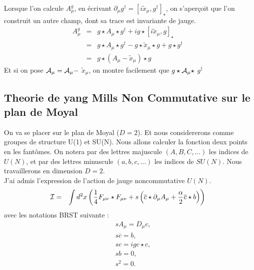 \documentclass[a4paper,11pt]{article}
\theoremstyle{plain}
\theoremstyle{definition}
\theoremstyle{remark}
\numberwithin{equation}{section}
\numberwithin{equation}{subsection}
\numberwithin{figure}{section}
\begin{document}
\noindent
Lorsque l'on calcule $A_{\mu}^{g}$, en écrivant $ \partial_{\mu} g^{\dagger}  =  [ i \tilde{x}_{\mu} , g^{\dagger}   ]_{\star}$, on s'aperçoit 
que l'on construit un autre champ, dont sa trace est invariante de jauge.
\begin{eqnarray}
  A_{\mu}^{g}  &=&  g \star A_{\mu} \star g^{\dagger} + i g \star  [ i \tilde{x}_{\mu} , g ]_{\star}   \\
                         &=&  g \star A_{\mu} \star g^{\dagger} - g \star  \tilde{x}_{\mu} \star  g  + g \star  g^{\dagger}     \\
                         &=&  g \star \left(  A_{\mu} -  \tilde{x}_{\mu} \right) \star  g
\end{eqnarray}
Et si on pose $\cal{A}_{\mu}  =  A_{\mu} - $ $ \tilde{x}_{\mu}  $, on montre facilement que $g \star \cal{A}_{\mu}  \star$  $g^{\dagger}$

\subsection{Theorie de yang Mills Non Commutative sur le plan de Moyal}

\noindent
On va se placer sur le plan de Moyal ($D=2$). Et nous considererons comme groupes de structure U(1) et SU(N).
\noindent
Nous allons calculer la fonction deux points en les fantômes. On notera par des lettres majuscule $(A,B,C,...)$ les indices de $U(N)$, 
et par des lettres minuscule $(a,b,c,...)$ les indices de $SU(N)$. Nous travaillerons en dimension $D=2$.\\

\noindent
J'ai admis l'expression de l'action de jauge noncommutative $U(N)$.
\begin{eqnarray}
 \cal{I}  &=&  \int d^{2 } x  \left(  \frac{1}{4}  F_{\mu  \nu}  \star  F_{\mu  \nu}  + s \left( \overline{c} \star \partial_{\mu} A_{\mu}   
+  \frac{\alpha}{2} \overline{c} \star b \right)  \right)
\end{eqnarray}
avec les notations BRST suivante :
\begin{eqnarray}
 &&s A_{\mu}  = D_ {\mu} c,  \\
 &&s \overline{c} = b,  \\
 &&s c = i g c\star c,  \\
 &&sb = 0,\\
 &&s^{2} = 0.
\end{eqnarray}\\
\end{document}

